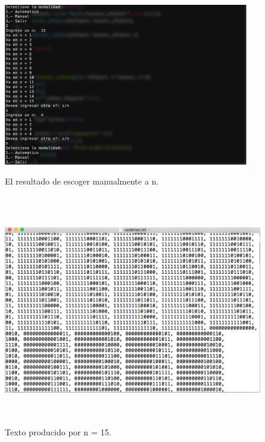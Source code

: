 \documentclass[12pt]{article}
\begin{document}
\begin{figure}[H]
\includegraphics[width=\textwidth, height=7cm]{alfabetos_manual}
\label{fig:manual_alfabeto}
\caption{El resultado de escoger manualmente a n.}
\end{figure}

\begin{figure}[H]
\includegraphics[width=\textwidth, height=10cm]{alfabeto_muestra_manual}
\caption{Texto producido por n = 15.}
\label{fig:manual_alfabeto_texto}
\end{figure}

\newpage
\end{document}
